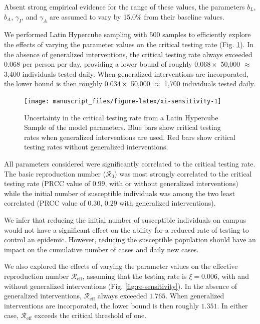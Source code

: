\documentclass[
]{article}
\begin{document}
Absent strong empirical evidence for the range of these values, the
parameters \(b_L\), \(b_A\), \(\gamma_I\), and \(\gamma_A\) are assumed
to vary by 15.0\% from their baseline values.

We performed Latin Hypercube sampling with \(500\) samples to
efficiently explore the effects of varying the parameter values on the
critical testing rate (Fig. \ref{fig:xi-sensitivity}). In the absence of
generalized interventions, the critical testing rate always exceeded
\(0.068\) per person per day, providing a lower bound of roughly
\(0.068 \times\) 50,000 \(\approx\) 3,400 individuals tested daily. When
generalized interventions are incorporated, the lower bound is then
roughly \(0.034 \times\) 50,000 \(\approx\) 1,700 individuals tested
daily.

\begin{figure}

{\centering \texttt{[image: manuscript\_files/figure-latex/xi-sensitivity-1]} 

}

\caption{\label{fig:xi-sensitivity}Uncertainty in the critical testing rate from a Latin Hypercube Sample of the model parameters. Blue bars show critical testing rates when generalized interventions are used. Red bars show critical testing rates without generalized interventions.}\label{fig:xi-sensitivity}
\end{figure}

All parameters considered were significantly correlated to the critical
testing rate. The basic reproduction number (\(\mathcal{R}_0\)) was most
strongly correlated to the critical testing rate (PRCC value of
\(0.99\), with or without generalized interventions) while the initial
number of susceptible individuals was among the two least correlated
(PRCC value of \(0.30\), \(0.29\) with generalized interventions).

We infer that reducing the initial number of susceptible individuals on
campus would not have a significant effect on the ability for a reduced
rate of testing to control an epidemic. However, reducing the
susceptible population should have an impact on the cumulative number of
cases and daily new cases.

We also explored the effects of varying the parameter values on the
effective reproduction number \(\mathcal{R}_\text{eff}\), assuming that
the testing rate is \(\xi = 0.006\), with and without generalized
interventions (Fig. \ref{fig:re-sensitivity}). In the absence of
generalized interventions, \(\mathcal{R}_\text{eff}\) always exceeded
\(1.765\). When generalized interventions are incorporated, the lower
bound is then roughly \(1.351\). In either case,
\(\mathcal{R}_\text{eff}\) exceeds the critical threshold of one.
\end{document}
